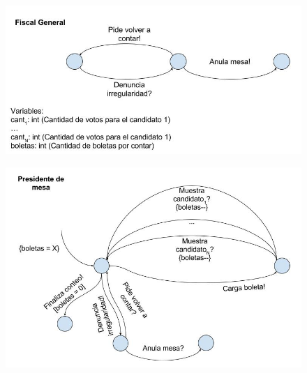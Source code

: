 \begin{figure}[h!]
\centering
\includegraphics[scale=0.5]{imagenes/FSMs/Conteo/Conteodevotosdeunamesa3}
\end{figure}			

\begin{figure}[h!]
\centering
\includegraphics[scale=0.5]{imagenes/FSMs/Conteo/Conteodevotosdeunamesa2}
\end{figure}

